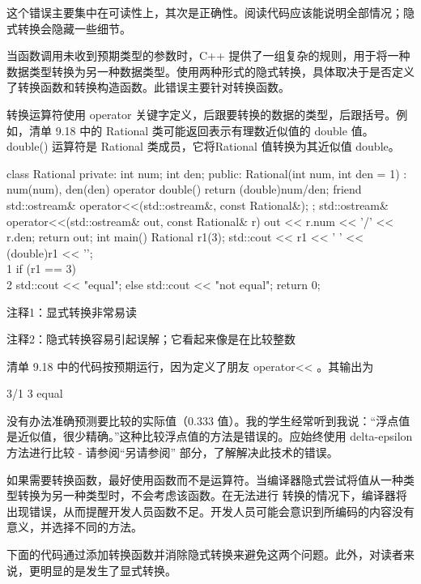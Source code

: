 这个错误主要集中在可读性上，其次是正确性。阅读代码应该能说明全部情况；隐式转换会隐藏一些细节。

当函数调用未收到预期类型的参数时，C++ 提供了一组复杂的规则，用于将一种数据类型转换为另一种数据类型。使用两种形式的隐式转换，具体取决于是否定义了转换函数和转换构造函数。此错误主要针对转换函数。


转换运算符使用 operator 关键字定义，后跟要转换的数据的类型，后跟括号。例如，清单 9.18 中的 Rational 类可能返回表示有理数近似值的 double 值。double() 运算符是 Rational 类成员，它将Rational 值转换为其近似值 double。


\begin{cpp}
class Rational {
private:
  int num;
  int den;
public:
  Rational(int num, int den = 1) : num(num), den(den) {}
  operator double() { return (double)num/den; }
  friend std::ostream& operator<<(std::ostream&, const Rational&);
};
std::ostream& operator<<(std::ostream& out, const Rational& r) {
  out << r.num << '/' << r.den;
  return out;
}
int main() {
  Rational r1(3);
  std::cout << r1 << ' ' << (double)r1 << '\n'; \\ 1
  if (r1 == 3) \\ 2
    std::cout << "equal\n";
  else
    std::cout << "not equal\n";
  return 0;
}
\end{cpp}

{\footnotesize
注释1：显式转换非常易读

注释2：隐式转换容易引起误解；它看起来像是在比较整数
}

清单 9.18 中的代码按预期运行，因为定义了朋友 operator<{}< 。其输出为

\begin{shell}
3/1 3
equal
\end{shell}

没有办法准确预测要比较的实际值（0.333 值）。我的学生经常听到我说：“浮点值是近似值，很少精确。”这种比较浮点值的方法是错误的。应始终使用 delta-epsilon 方法进行比较 - 请参阅“另请参阅” 部分，了解解决此技术的错误。


如果需要转换函数，最好使用函数而不是运算符。当编译器隐式尝试将值从一种类型转换为另一种类型时，不会考虑该函数。在无法进行 转换的情况下，编译器将出现错误，从而提醒开发人员函数不足。开发人员可能会意识到所编码的内容没有意义，并选择不同的方法。

下面的代码通过添加转换函数并消除隐式转换来避免这两个问题。此外，对读者来说，更明显的是发生了显式转换。

